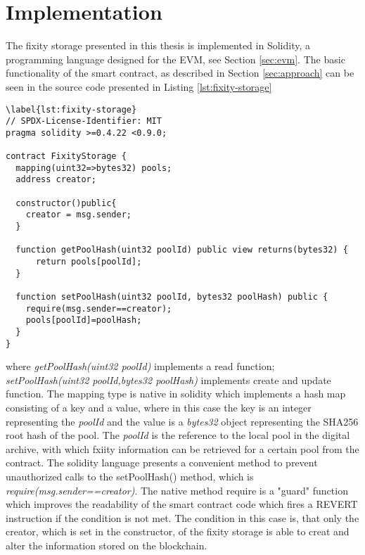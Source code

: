 \section{Implementation}
The fixity storage presented in this thesis is implemented in Solidity, a programming language designed for the EVM, see Section \ref{sec:evm}.
The basic functionality of the smart contract, as described in Section \ref{sec:approach} can be seen in the source code presented in Listing \ref{lst:fixity-storage}
\begin{lstlisting}[language=Solidity,caption={MVP source code of the fixity storage deployed on the Ropsten test network https://ropsten.etherscan.io/address/0x18648B486Bd6B771DB957590E988A2464F22BfCd TODODODODO},label={lst:fixity-storage}]
    \label{lst:fixity-storage}
// SPDX-License-Identifier: MIT
pragma solidity >=0.4.22 <0.9.0;

contract FixityStorage {
  mapping(uint32=>bytes32) pools;
  address creator;

  constructor()public{
    creator = msg.sender;
  }

  function getPoolHash(uint32 poolId) public view returns(bytes32) {
      return pools[poolId];
  }

  function setPoolHash(uint32 poolId, bytes32 poolHash) public {
    require(msg.sender==creator);
    pools[poolId]=poolHash;
  }
}
\end{lstlisting}
where \textit{getPoolHash(uint32 poolId)} implements a read function; \textit{setPoolHash(uint32 poolId,bytes32 poolHash)} implements create and update function. The mapping type is native in solidity which implements a hash map consisting of a key and a value, where in this case the key is an integer representing the \textit{poolId} and the value is a \textit{bytes32} object representing the SHA256 root hash of the pool. The \textit{poolId} is the reference to the local pool in the digital archive, with which fxiity information can be retrieved for a certain pool from the contract. The solidity language presents a convenient  method to prevent unauthorized calls to the setPoolHash() method, which is \textit{require(msg.sender==creator)}. The native method require is a "guard" function which improves the readability of the smart contract code which fires a REVERT instruction if the condition is not met. The condition in this case is, that only the creator, which is set in the constructor, of the fixity storage is able to creat and alter the information stored on the blockchain.
